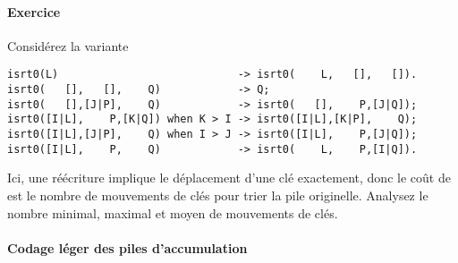 \paragraph{Exercice}

Considérez la variante
{\small
\begin{verbatim}
isrt0(L)                            -> isrt0(    L,   [],   []).
isrt0(   [],   [],    Q)            -> Q;
isrt0(   [],[J|P],    Q)            -> isrt0(   [],    P,[J|Q]);
isrt0([I|L],    P,[K|Q]) when K > I -> isrt0([I|L],[K|P],    Q);
isrt0([I|L],[J|P],    Q) when I > J -> isrt0([I|L],    P,[J|Q]);
isrt0([I|L],    P,    Q)            -> isrt0(    L,    P,[I|Q]).
\end{verbatim}
}
\noindent Ici, une réécriture implique le déplacement d'une clé
exactement, donc le coût de  est le nombre de
mouvements de clés pour trier la pile originelle. Analysez le nombre
minimal, maximal et moyen de mouvements de clés.

\paragraph{Codage léger des piles d'accumulation}

